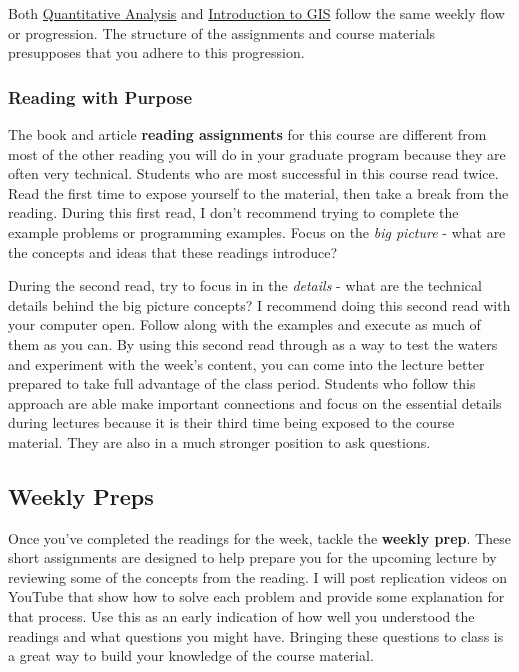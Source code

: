 \documentclass[]{book}
\theoremstyle{definition}
\theoremstyle{definition}
\theoremstyle{definition}
\theoremstyle{remark}
\begin{document}
Both \href{https://slu-soc5050.github.io}{Quantitative Analysis} and
\href{https://slu-soc5650.github.io}{Introduction to GIS} follow the
same weekly flow or progression. The structure of the assignments and
course materials presupposes that you adhere to this progression.

\subsubsection{Reading with Purpose}\label{reading-with-purpose}

The book and article \textbf{reading assignments} for this course are
different from most of the other reading you will do in your graduate
program because they are often very technical. Students who are most
successful in this course read twice. Read the first time to expose
yourself to the material, then take a break from the reading. During
this first read, I don't recommend trying to complete the example
problems or programming examples. Focus on the \emph{big picture} - what
are the concepts and ideas that these readings introduce?

During the second read, try to focus in in the \emph{details} - what are
the technical details behind the big picture concepts? I recommend doing
this second read with your computer open. Follow along with the examples
and execute as much of them as you can. By using this second read
through as a way to test the waters and experiment with the week's
content, you can come into the lecture better prepared to take full
advantage of the class period. Students who follow this approach are
able make important connections and focus on the essential details
during lectures because it is their third time being exposed to the
course material. They are also in a much stronger position to ask
questions.

\subsection{Weekly Preps}\label{weekly-preps}

Once you've completed the readings for the week, tackle the
\textbf{weekly prep}. These short assignments are designed to help
prepare you for the upcoming lecture by reviewing some of the concepts
from the reading. I will post replication videos on YouTube that show
how to solve each problem and provide some explanation for that process.
Use this as an early indication of how well you understood the readings
and what questions you might have. Bringing these questions to class is
a great way to build your knowledge of the course material.
\end{document}
